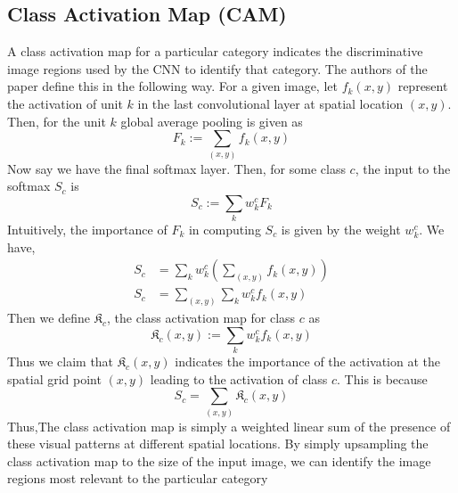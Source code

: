 \subsection{Class Activation Map (CAM)}
A class activation map for a particular category indicates the discriminative image regions used by the CNN to identify that category. The authors of the paper \cite{CAM} define this in the following way. For a given image, let $f_k(x,y)$ represent the activation of unit $k$ in the last convolutional layer at spatial location $(x,y)$. Then, for the unit $k$ global average pooling is given as \[F_k := \sum_{(x,y)}f_k(x,y)\]
Now say we have the final softmax layer. Then, for some class $c$, the input to the softmax $S_c$ is 
\[S_c := \sum_k w_k^cF_k\]
Intuitively, the importance of $F_k$ in computing $S_c$ is given by the weight $w_k^c$. We have,
\begin{align}
S_c &= \sum_kw_k^c\left(\sum_{(x,y)}f_k(x,y)\right) \\ 
S_c &= \sum_{(x,y)}\sum_kw_k^cf_k(x,y) 
\end{align}
Then we define $\mathfrak{K}_c$, the class activation map for class $c$ as
\[\mathfrak{K}_c(x,y) := \sum_kw_k^cf_k(x,y)\]
Thus we claim that $\mathfrak{K}_c(x,y)$ indicates the importance of the activation at the spatial grid point $(x,y)$ leading to the activation of class $c$. This is because
\[S_c = \sum_{(x,y)}\mathfrak{K}_c(x,y)\]
Thus,The class activation map is simply a weighted linear sum of the presence of these visual patterns at different spatial locations. By simply upsampling the class activation map to the size of the input image, we can identify the image regions most relevant to the particular category
    